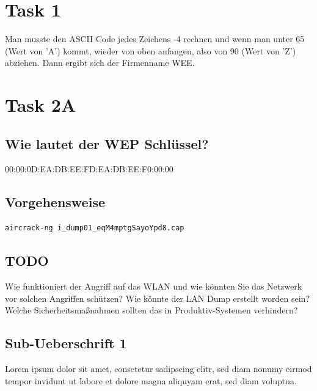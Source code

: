 \documentclass[12pt,a4paper,titlepage,oneside]{scrartcl}
\begin{document}
\maketitle
\setcounter{section}{0}
\setcounter{tocdepth}{2}
\tableofcontents

%
%

\section{Task 1}

Man musste den ASCII Code jedes Zeichens -4 rechnen und wenn man unter 65 (Wert von 'A') kommt, wieder von oben anfangen, also von 90 (Wert von 'Z') abziehen. Dann ergibt sich der Firmenname WEE.

\section{Task 2A}

\subsection{Wie lautet der WEP Schlüssel?}

00:00:0D:EA:DB:EE:FD:EA:DB:EE:F0:00:00

\subsection{Vorgehensweise}

\begin{lstlisting}
aircrack-ng i_dump01_eqM4mptgSayoYpd8.cap
\end{lstlisting}


\subsection{TODO}

Wie funktioniert der Angriff auf das WLAN und wie könnten Sie das Netzwerk vor solchen Angriffen schützen?
Wie könnte der LAN Dump erstellt worden sein? Welche Sicherheitsmaßnahmen sollten das in Produktiv-Systemen verhindern?

\subsection{Sub-Ueberschrift 1}
Lorem ipsum dolor sit amet, consetetur sadipscing elitr, sed diam nonumy eirmod tempor invidunt ut labore et dolore magna aliquyam erat, sed diam voluptua. 
\end{document}
